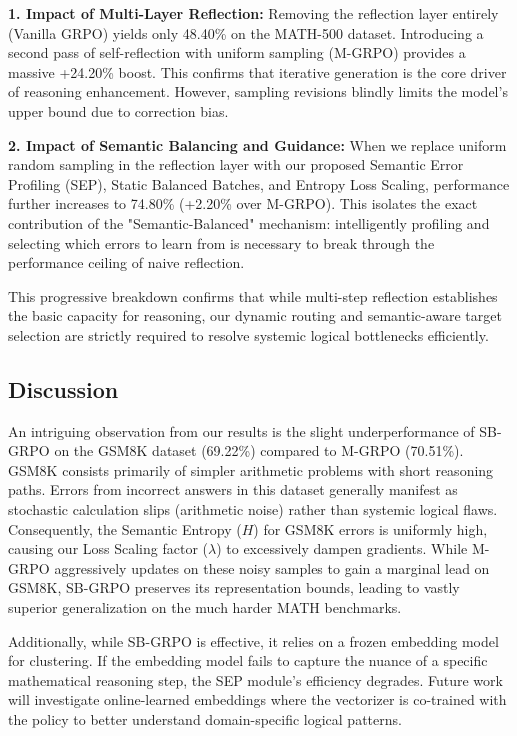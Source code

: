 \textbf{1. Impact of Multi-Layer Reflection:} Removing the reflection layer entirely (Vanilla GRPO) yields only 48.40\% on the MATH-500 dataset. Introducing a second pass of self-reflection with uniform sampling (M-GRPO) provides a massive +24.20\% boost. This confirms that iterative generation is the core driver of reasoning enhancement. However, sampling revisions blindly limits the model's upper bound due to correction bias.

\textbf{2. Impact of Semantic Balancing and Guidance:} When we replace uniform random sampling in the reflection layer with our proposed Semantic Error Profiling (SEP), Static Balanced Batches, and Entropy Loss Scaling, performance further increases to 74.80\% (+2.20\% over M-GRPO). This isolates the exact contribution of the "Semantic-Balanced" mechanism: intelligently profiling and selecting which errors to learn from is necessary to break through the performance ceiling of naive reflection.

This progressive breakdown confirms that while multi-step reflection establishes the basic capacity for reasoning, our dynamic routing and semantic-aware target selection are strictly required to resolve systemic logical bottlenecks efficiently.

\subsection{Discussion}
An intriguing observation from our results is the slight underperformance of SB-GRPO on the GSM8K dataset (69.22\%) compared to M-GRPO (70.51\%). GSM8K consists primarily of simpler arithmetic problems with short reasoning paths. Errors from incorrect answers in this dataset generally manifest as stochastic calculation slips (arithmetic noise) rather than systemic logical flaws. Consequently, the Semantic Entropy ($H$) for GSM8K errors is uniformly high, causing our Loss Scaling factor ($\lambda$) to excessively dampen gradients. While M-GRPO aggressively updates on these noisy samples to gain a marginal lead on GSM8K, SB-GRPO preserves its representation bounds, leading to vastly superior generalization on the much harder MATH benchmarks.

Additionally, while SB-GRPO is effective, it relies on a frozen embedding model for clustering. If the embedding model fails to capture the nuance of a specific mathematical reasoning step, the SEP module's efficiency degrades. Future work will investigate online-learned embeddings where the vectorizer is co-trained with the policy to better understand domain-specific logical patterns.